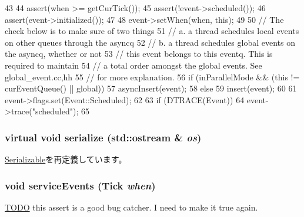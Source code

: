 \begin{DoxyCode}
43 {
44     assert(when >= getCurTick());
45     assert(!event->scheduled());
46     assert(event->initialized());
47 
48     event->setWhen(when, this);
49 
50     // The check below is to make sure of two things
51     // a. a thread schedules local events on other queues through the asyncq
52     // b. a thread schedules global events on the asyncq, whether or not
53     //    this event belongs to this eventq. This is required to maintain
54     //    a total order amongst the global events. See global_event.{cc,hh}
55     //    for more explanation.
56     if (inParallelMode && (this != curEventQueue() || global)) {
57         asyncInsert(event);
58     } else {
59         insert(event);
60     }
61     event->flags.set(Event::Scheduled);
62 
63     if (DTRACE(Event))
64         event->trace("scheduled");
65 }
\end{DoxyCode}
\hypertarget{classEventQueue_ad6272f80ae37e8331e3969b3f072a801}{
\subsubsection[{serialize}]{\setlength{\rightskip}{0pt plus 5cm}virtual void serialize (std::ostream \& {\em os})}}
\label{classEventQueue_ad6272f80ae37e8331e3969b3f072a801}


\hyperlink{classSerializable_ad6272f80ae37e8331e3969b3f072a801}{Serializable}を再定義しています。\hypertarget{classEventQueue_adc925eabe90846085072915cc6c544c2}{
\subsubsection[{serviceEvents}]{\setlength{\rightskip}{0pt plus 5cm}void serviceEvents ({\bf Tick} {\em when})}}
\label{classEventQueue_adc925eabe90846085072915cc6c544c2}


\begin{Desc}
\item[\hyperlink{todo__todo000091}{TODO}]this assert is a good bug catcher. I need to make it true again. \end{Desc}




